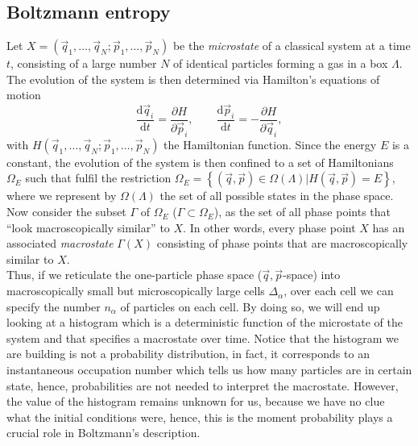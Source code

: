 \subsection{ Boltzmann entropy}
Let  $X=(\vec{q}_1,\ldots,\vec{q}_N;\vec{p}_1,\ldots,\vec{p}_N)$ be the \textit{microstate} of a classical system at a time $t$, consisting of a large number $N$ of identical particles forming a gas in a box $\Lambda$. The evolution of the system is then determined via Hamilton's equations of motion
\begin{equation}
\frac{\mathrm{d} \vec{q}_i}{ \mathrm{d} t} = \frac{\partial H}{\partial \vec{p}_i}, \qquad \frac{\mathrm{d} \vec{p}_i}{ \mathrm{d} t} = -\frac{\partial H}{\partial \vec{q}_i},
\end{equation}
with $H(\vec{q}_1,\ldots,\vec{q}_N;\vec{p}_1,\ldots,\vec{p}_N)$ the Hamiltonian function. Since the energy $E$ is a constant, the evolution of the system is then confined to a set of Hamiltonians $\Omega_{E}$ such that fulfil the restriction $\Omega_{E}=\left\{(\vec{q},\vec{p})\in \Omega(\Lambda) | H(\vec{q},\vec{p})=E\right\}$, where we represent by $\Omega(\Lambda)$ the set of all possible states in the phase space. Now consider the subset $\Gamma$ of $\Omega_E$ ($\Gamma \subset \Omega_E$), as the set of all phase points that ``look macroscopically similar'' to $X$. In other words, every phase point $X$ has an associated \textit{macrostate}  $\Gamma(X)$ consisting of phase points that are macroscopically similar to $X$.\\
 \indent Thus, if we reticulate the one-particle phase space ($\vec{q},\vec{p}$-space) into macroscopically small but microscopically large cells $\Delta_{\alpha}$, over each cell we can specify the number $n_\alpha$ of particles on each cell. By doing so, we will end up looking at a histogram which is a deterministic function of the microstate of the system and that specifies a macrostate over time. Notice that the histogram we are building is not a probability distribution, in fact, it corresponds to an instantaneous occupation number which tells us how many particles are in certain state, hence, probabilities are not needed to interpret the macrostate. However, the value of the histogram remains unknown for us, because we have no clue what the initial conditions were, hence, this is the moment probability plays a crucial role in Boltzmann's description.\\
 
